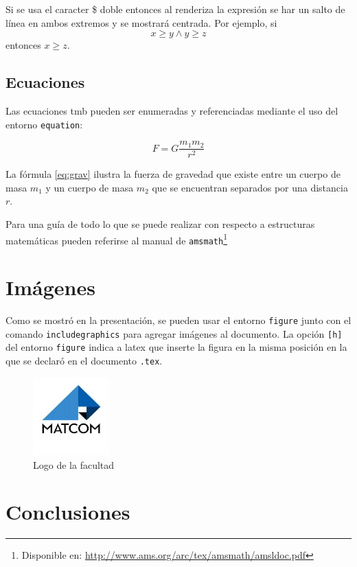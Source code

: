 \documentclass[a4paper,12pt]{article}
\begin{document}
Si se usa el caracter \$ doble entonces al renderiza la expresión se har un
salto de línea en ambos extremos y se mostrará centrada. Por ejemplo, si $$x \ge
y \wedge y \ge z$$ entonces $x \ge z$.

\subsection{Ecuaciones}\label{sub:eq}

Las ecuaciones tmb pueden ser enumeradas y referenciadas mediante el uso del
entorno \texttt{equation}:

\begin{equation}\label{eq:grav}
    F = G\frac{m_1m_2}{r^2}
\end{equation}

La fórmula \ref{eq:grav} ilustra la fuerza de gravedad que existe entre un
cuerpo de masa $m_1$ y un cuerpo de masa $m_2$ que se encuentran separados por
una distancia $r$.

Para una guía de todo lo que se puede realizar con respecto a estructuras
matemáticas pueden referirse al manual de \texttt{amsmath}\footnote{Disponible
en: \url{http://www.ams.org/arc/tex/amsmath/amsldoc.pdf}}

\section{Imágenes}\label{sec:img-and-tables}

Como se mostró en la presentación, se pueden usar el entorno \texttt{figure}
junto con el comando \texttt{includegraphics} para agregar imágenes al
documento.  La opción \texttt{[h]} del entorno \texttt{figure} indica a latex que
inserte la figura en la misma posición en la que se declaró en el documento
\texttt{.tex}.

\begin{figure}[h]
    \center
    \includegraphics[width=3cm]{matcom.jpg}
    \caption{Logo de la facultad}
    \label{fig:logo}
\end{figure}

\section{Conclusiones}\label{sec:concl}
\end{document}

